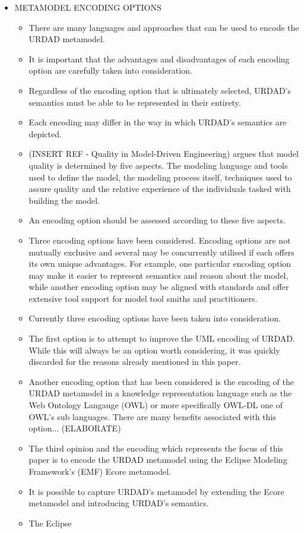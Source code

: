 \begin{itemize}
	
	\item METAMODEL ENCODING OPTIONS
		\begin{itemize}
				\item There are many languages and approaches that can be used to encode the URDAD metamodel. 
				\item It is important that the advantages and disadvantages of each encoding option are carefully taken into consideration.
				\item Regardless of the encoding option that is ultimately selected, URDAD's semantics must be able to be represented in their entirety.
				\item Each encoding may differ in the way in which URDAD's semantics are depicted.				
				\item (INSERT REF - Quality in Model-Driven Engineering) argues that model quality is determined by five aspects. The modeling language and tools used to define the model, the modeling process itself, techniques used to assure quality and the relative experience of the individuals tasked with building the model.
				\item An encoding option should be assessed according to these five aspects.
				\item Three encoding options have been considered. Encoding options are not mutually exclusive and several may be concurrently utilised if each offers its own unique advantages. For example, one particular encoding option may make it easier to represent semantics and reason about the model, while another encoding option may be aligned with standards and offer extensive tool support for model tool smiths and practitioners. 
				\item Currently three encoding options have been taken into consideration.
				\item The first option is to attempt to improve the UML encoding of URDAD. While this will always be an option worth considering, it was quickly discarded for the reasons already mentioned in this paper.
				\item Another encoding option that has been considered is the encoding of the URDAD metamodel in a knowledge representation language such as the Web Ontology Langauge (OWL) or more specifically OWL-DL one of OWL's sub languages. There are many benefits associated with this option... (ELABORATE)
				\item The third opinion and the encoding which represents the focus of this paper is to encode the URDAD metamodel using the Eclipse Modeling Framework's (EMF) Ecore metamodel. 
				\item It is possible to capture URDAD's metamodel by extending the Ecore metamodel and introducing URDAD's semantics.
				\item The Eclipse 
				

\end{itemize}
\end{itemize}

